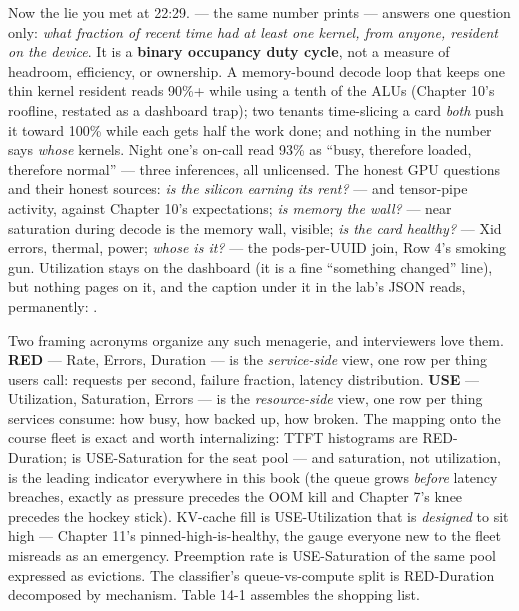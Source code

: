 Now the lie you met at 22:29.  — the same number  prints — answers one question only: \textit{what fraction of recent time had at least one kernel, from anyone, resident on the device}. It is a \textbf{binary occupancy duty cycle}, not a measure of headroom, efficiency, or ownership. A memory-bound decode loop that keeps one thin kernel resident reads 90\%+ while using a tenth of the ALUs (Chapter 10’s roofline, restated as a dashboard trap); two tenants time-slicing a card \textit{both} push it toward 100\% while each gets half the work done; and nothing in the number says \textit{whose} kernels. Night one’s on-call read 93\% as “busy, therefore loaded, therefore normal” — three inferences, all unlicensed. The honest GPU questions and their honest sources: \textit{is the silicon earning its rent?} —  and tensor-pipe activity, against Chapter 10’s expectations; \textit{is memory the wall?} —  near saturation during decode is the memory wall, visible; \textit{is the card healthy?} — Xid errors, thermal, power; \textit{whose is it?} — the pods-per-UUID join, Row 4’s smoking gun. Utilization stays on the dashboard (it is a fine “something changed” line), but nothing pages on it, and the caption under it in the lab’s JSON reads, permanently: .

Two framing acronyms organize any such menagerie, and interviewers love them. \textbf{RED} — Rate, Errors, Duration — is the \textit{service-side} view, one row per thing users call: requests per second, failure fraction, latency distribution. \textbf{USE} — Utilization, Saturation, Errors — is the \textit{resource-side} view, one row per thing services consume: how busy, how backed up, how broken. The mapping onto the course fleet is exact and worth internalizing: TTFT histograms are RED-Duration;  is USE-Saturation for the seat pool — and saturation, not utilization, is the leading indicator everywhere in this book (the queue grows \textit{before} latency breaches, exactly as  pressure precedes the OOM kill and Chapter 7’s knee precedes the hockey stick). KV-cache fill is USE-Utilization that is \textit{designed} to sit high — Chapter 11’s pinned-high-is-healthy, the gauge everyone new to the fleet misreads as an emergency. Preemption rate is USE-Saturation of the same pool expressed as evictions. The classifier’s queue-vs-compute split is RED-Duration decomposed by mechanism. Table 14-1 assembles the shopping list.

